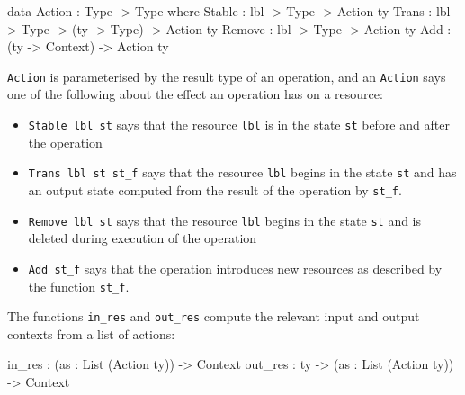 \small
\begin{code}
data Action : Type -> Type where
     Stable : lbl -> Type -> Action ty
     Trans : lbl -> Type -> (ty -> Type) -> Action ty
     Remove : lbl -> Type -> Action ty
     Add : (ty -> Context) -> Action ty
\end{code}
\normalsize

\texttt{Action} is parameterised by the result type of an operation, and an
\texttt{Action} says one of the following about the effect an operation has on
a resource:

\begin{itemize}
\item \texttt{Stable lbl st} says that the resource \texttt{lbl}
is in the state \texttt{st} before and after the operation
\item \texttt{Trans lbl st st\_f} says that the resource \texttt{lbl}
begins in the state \texttt{st} and has an output state computed from the
result of the operation by \texttt{st\_f}.
\item \texttt{Remove lbl st} says that the resource \texttt{lbl} begins in
the state \texttt{st} and is deleted during execution of the operation
\item \texttt{Add st\_f} says that the operation introduces new
resources as described by the function \texttt{st\_f}.
\end{itemize}

The functions \texttt{in\_res} and \texttt{out\_res} compute
the relevant input and output contexts from a list of actions:

\small
\begin{code}
in_res : (as : List (Action ty)) -> Context
out_res : ty -> (as : List (Action ty)) -> Context
\end{code}
\normalsize



